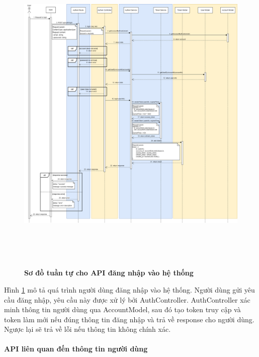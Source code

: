 \begin{figure}[H]
  \centering
  \includegraphics[width=16cm,height=16cm]{Images/sequence_api/login.png}
  \caption[Sơ đồ tuần tự cho API đăng nhập vào hệ thống]{\bfseries \fontsize{12pt}{0pt}
  \selectfont Sơ đồ tuần tự cho API đăng nhập vào hệ thống }
  \label{api_login} %
\end{figure}
Hình \ref{api_login}  mô tả quá trình người dùng đăng nhập vào hệ thống. Người dùng gửi yêu cầu đăng nhập, yêu cầu này được xử lý bởi AuthController. AuthController xác minh thông tin người dùng qua AccountModel, sau đó tạo token truy cập và token làm mới 
nếu đúng thông tin đăng nhập và trả về response cho người dùng. Ngược lại sẽ trả về lỗi nếu thông tin không chính xác.





\paragraph{API liên quan đến thông tin người dùng}
\mbox{}

